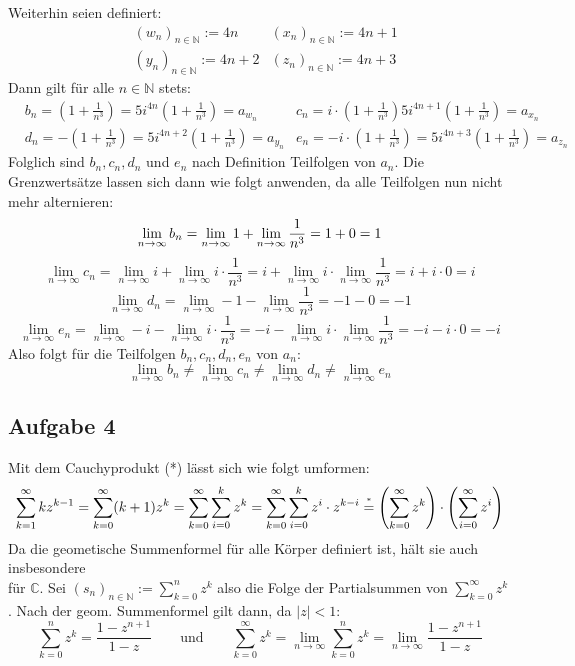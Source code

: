 \documentclass[a4paper,graphics,11pt]{article}
\newcommand{\aufgabe}[1]{\subsection*{Aufgabe #1}}
\newcommand{\up}[2]{\mathrel{\overset{\makebox[0pt]{\mbox{\normalfont\tiny #2}}}{#1}}}
\begin{document}
Weiterhin seien definiert:
\begin{align*}
    &(w_n)_{n\in \mathbb{N}} := 4n&
    (x_n)_{n\in \mathbb{N}} := 4n+1\\
    &(y_n)_{n\in \mathbb{N}} := 4n+2&
    (z_n)_{n\in \mathbb{N}} := 4n+3
\end{align*}
Dann gilt für alle $n\in \mathbb{N}$ stets:
\begin{align*}
    &b_n = \left(1+\frac{1}{n^3}\right)=  5i^{4n}\left(1+\frac{1}{n^3}\right) = a_{w_n}&
    c_n = i\cdot\left(1+\frac{1}{n^3}\right)5i^{4n+1}\left(1+\frac{1}{n^3}\right) = a_{x_n}\\
    &d_n = -\left(1+\frac{1}{n^3}\right) = 5i^{4n+2}\left(1+\frac{1}{n^3}\right) = a_{y_n}&
    e_n = -i\cdot\left(1+\frac{1}{n^3}\right)=5i^{4n+3}\left(1+\frac{1}{n^3}\right) = a_{z_n}
\end{align*}
Folglich sind $b_n,c_n,d_n$ und $e_n$ nach Definition Teilfolgen von $a_n$.
Die Grenzwertsätze lassen sich dann wie folgt anwenden, da alle Teilfolgen nun
nicht mehr alternieren:
$$
    \lim_{n \to \infty} b_n
    = \lim_{n \to \infty} 1+ \lim_{n \to \infty} \frac{1}{n^3}
    = 1+0 =1\\
$$$$
    \lim_{n \to \infty} c_n
    = \lim_{n \to \infty} i+ \lim_{n \to \infty} i\cdot \frac{1}{n^3}
    = i+\lim_{n \to \infty} i\cdot \lim_{n \to \infty} \frac{1}{n^3}
    = i+i\cdot 0 = i
$$$$
    \lim_{n \to \infty} d_n
    = \lim_{n \to \infty} -1 - \lim_{n \to \infty} \frac{1}{n^3}
    = -1 - 0 = -1
$$$$
   \lim_{n \to \infty} e_n
    = \lim_{n \to \infty} -i- \lim_{n \to \infty} i\cdot \frac{1}{n^3}
    = -i-\lim_{n \to \infty} i\cdot \lim_{n \to \infty} \frac{1}{n^3}
    = -i-i\cdot 0 = -i
$$
Also folgt für die Teilfolgen $b_n,c_n,d_n,e_n$ von $a_n\colon$
$$
    \lim_{n \to \infty} b_n \neq
    \lim_{n \to \infty} c_n \neq
    \lim_{n \to \infty} d_n \neq
    \lim_{n \to \infty} e_n
$$
\newpage
\aufgabe{4}
Mit dem Cauchyprodukt (*) lässt sich wie folgt umformen:
$$
    \sum_{k=1}^{\infty} kz^{k-1}
    = \sum_{k=0}^{\infty} (k+1)z^k
    = \sum_{k=0}^{\infty} \sum_{i=0}^{k} z^k
    = \sum_{k=0}^{\infty} \sum_{i=0}^{k} z^i\cdot z^{k-i}
    \up{=}{*} \left(\sum_{k=0}^{\infty} z^k\right) \cdot \left(\sum_{i=0}^{\infty} z^i\right)
$$
Da die geometische Summenformel für alle Körper definiert ist, hält sie auch insbesondere\\
für $\mathbb{C}$. Sei $(s_n)_{n\in \mathbb{N}} := \sum_{k=0}^{n} z^k$ also die Folge
der Partialsummen von $\sum_{k=0}^{\infty} z^k$. Nach der geom. Summenformel gilt dann, da
$|z| < 1\colon$
$$
    \sum_{k=0}^{n} z^k = \frac{1-z^{n+1}}{1-z} 
    \qquad\text{und}\qquad
    \sum_{k=0}^{\infty} z^k = \lim_{n \to \infty} \sum_{k=0}^{n} z^k
    = \lim_{n \to \infty} \frac{1-z^{n+1}}{1-z}
$$
\end{document}
